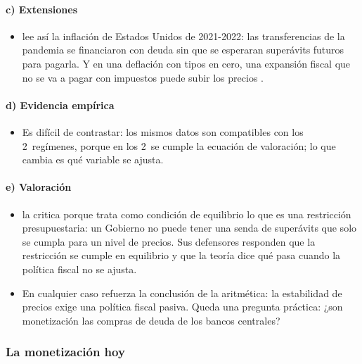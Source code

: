\documentclass[11pt]{article}
\begin{document}
\paragraph{c) Extensiones}

\begin{itemize}
\item \textcite{Cochrane2023Fiscal} lee así la inflación de Estados Unidos de 2021-2022: las transferencias de la pandemia se financiaron con deuda sin que se esperaran superávits futuros para pagarla. Y en una deflación con tipos en cero, una expansión fiscal que no se va a pagar con impuestos puede subir los precios .
\end{itemize}

\paragraph{d) Evidencia empírica}

\begin{itemize}
\item Es difícil de contrastar: los mismos datos son compatibles con los 2~regímenes, porque en los 2~se cumple la ecuación de valoración; lo que cambia es qué variable se ajusta.
\end{itemize}

\paragraph{e) Valoración}

\begin{itemize}
\item \textcite{Buiter2002Fiscal} la critica porque trata como condición de equilibrio lo que es una restricción presupuestaria: un Gobierno no puede tener una senda de superávits que solo se cumpla para un nivel de precios. Sus defensores responden que la restricción se cumple en equilibrio y que la teoría dice qué pasa cuando la política fiscal no se ajusta.
\item En cualquier caso refuerza la conclusión de la aritmética: la estabilidad de precios exige una política fiscal pasiva. Queda una pregunta práctica: ¿son monetización las compras de deuda de los bancos centrales?
\end{itemize}

\subsubsection{La monetización hoy}\label{sec:monetizacion}
\end{document}
